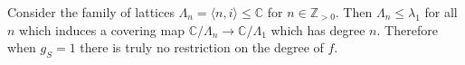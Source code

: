 \begin{example}
    Consider the family of lattices $\Lambda_n=\langle n,i\rangle\le\mathbb C$ for $n\in\mathbb Z_{>0}$.
    Then $\Lambda_n\le \lambda_1$ for all $n$ which induces a covering map $\mathbb C/\Lambda_n\to\mathbb C/\Lambda_1$ which has degree $n$.
    Therefore when $g_S=1$ there is truly no restriction on the degree of $f$.
\end{example}